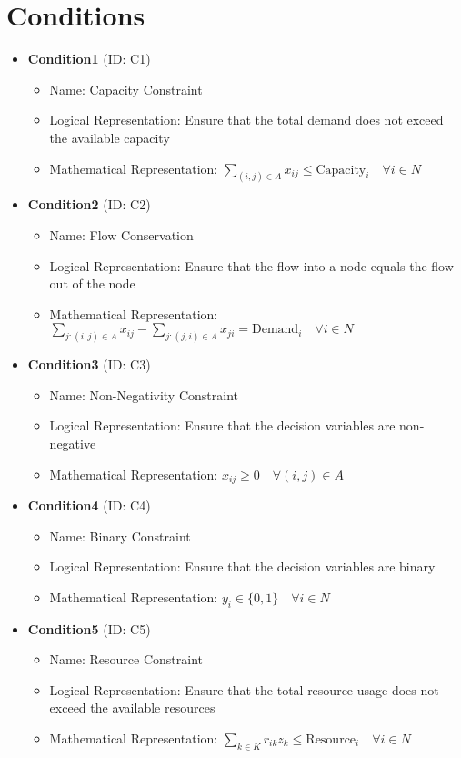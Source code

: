 \documentclass{article}
\begin{document}
\section{Conditions}
\begin{itemize}
    \item \textbf{Condition1} (ID: C1)
    \begin{itemize}
        \item Name: Capacity Constraint
        \item Logical Representation: Ensure that the total demand does not exceed the available capacity
        \item Mathematical Representation: $\sum_{(i,j) \in A} x_{ij} \leq \text{Capacity}_i \quad \forall i \in N$
    \end{itemize}
    \item \textbf{Condition2} (ID: C2)
    \begin{itemize}
        \item Name: Flow Conservation
        \item Logical Representation: Ensure that the flow into a node equals the flow out of the node
        \item Mathematical Representation: $\sum_{j:(i,j) \in A} x_{ij} - \sum_{j:(j,i) \in A} x_{ji} = \text{Demand}_i \quad \forall i \in N$
    \end{itemize}
    \item \textbf{Condition3} (ID: C3)
    \begin{itemize}
        \item Name: Non-Negativity Constraint
        \item Logical Representation: Ensure that the decision variables are non-negative
        \item Mathematical Representation: $x_{ij} \geq 0 \quad \forall (i,j) \in A$
    \end{itemize}
    \item \textbf{Condition4} (ID: C4)
    \begin{itemize}
        \item Name: Binary Constraint
        \item Logical Representation: Ensure that the decision variables are binary
        \item Mathematical Representation: $y_i \in \{0,1\} \quad \forall i \in N$
    \end{itemize}
    \item \textbf{Condition5} (ID: C5)
    \begin{itemize}
        \item Name: Resource Constraint
        \item Logical Representation: Ensure that the total resource usage does not exceed the available resources
        \item Mathematical Representation: $\sum_{k \in K} r_{ik} z_k \leq \text{Resource}_i \quad \forall i \in N$
    \end{itemize}
\end{itemize}
\end{document}
